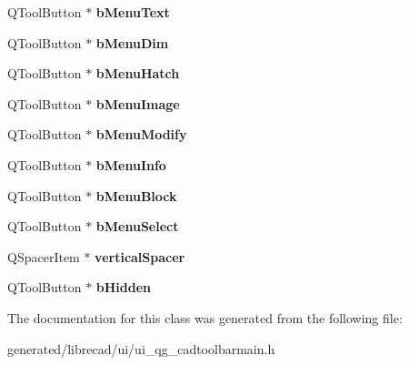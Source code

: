 \begin{DoxyCompactItemize}
\item 
\hypertarget{classUi__QG__CadToolBarMain_a41911ba633c4bcde1af62b72ae18f5fd}{Q\-Tool\-Button $\ast$ {\bfseries b\-Menu\-Text}}\label{classUi__QG__CadToolBarMain_a41911ba633c4bcde1af62b72ae18f5fd}

\item 
\hypertarget{classUi__QG__CadToolBarMain_a67d3a61254ef9d15b41d9de4131ca392}{Q\-Tool\-Button $\ast$ {\bfseries b\-Menu\-Dim}}\label{classUi__QG__CadToolBarMain_a67d3a61254ef9d15b41d9de4131ca392}

\item 
\hypertarget{classUi__QG__CadToolBarMain_a2be7b9b364c311cc0d6365adc1029621}{Q\-Tool\-Button $\ast$ {\bfseries b\-Menu\-Hatch}}\label{classUi__QG__CadToolBarMain_a2be7b9b364c311cc0d6365adc1029621}

\item 
\hypertarget{classUi__QG__CadToolBarMain_a27a05fd07c46bfca1a060d2c21ee260e}{Q\-Tool\-Button $\ast$ {\bfseries b\-Menu\-Image}}\label{classUi__QG__CadToolBarMain_a27a05fd07c46bfca1a060d2c21ee260e}

\item 
\hypertarget{classUi__QG__CadToolBarMain_a45615d4cdc8a5c83e16677ff0e3ff87b}{Q\-Tool\-Button $\ast$ {\bfseries b\-Menu\-Modify}}\label{classUi__QG__CadToolBarMain_a45615d4cdc8a5c83e16677ff0e3ff87b}

\item 
\hypertarget{classUi__QG__CadToolBarMain_a29c589d312c02b06b7988d540d0057fc}{Q\-Tool\-Button $\ast$ {\bfseries b\-Menu\-Info}}\label{classUi__QG__CadToolBarMain_a29c589d312c02b06b7988d540d0057fc}

\item 
\hypertarget{classUi__QG__CadToolBarMain_a724051edbf5e449ad440a1f82f79d5f1}{Q\-Tool\-Button $\ast$ {\bfseries b\-Menu\-Block}}\label{classUi__QG__CadToolBarMain_a724051edbf5e449ad440a1f82f79d5f1}

\item 
\hypertarget{classUi__QG__CadToolBarMain_a5fa0afeb0121b2b437f2696623e96129}{Q\-Tool\-Button $\ast$ {\bfseries b\-Menu\-Select}}\label{classUi__QG__CadToolBarMain_a5fa0afeb0121b2b437f2696623e96129}

\item 
\hypertarget{classUi__QG__CadToolBarMain_aca26dfad57c80e688b8f08bd67e800c7}{Q\-Spacer\-Item $\ast$ {\bfseries vertical\-Spacer}}\label{classUi__QG__CadToolBarMain_aca26dfad57c80e688b8f08bd67e800c7}

\item 
\hypertarget{classUi__QG__CadToolBarMain_a3224ea6c02cc9fa4abf07edd217ccf74}{Q\-Tool\-Button $\ast$ {\bfseries b\-Hidden}}\label{classUi__QG__CadToolBarMain_a3224ea6c02cc9fa4abf07edd217ccf74}

\end{DoxyCompactItemize}


The documentation for this class was generated from the following file\-:\begin{DoxyCompactItemize}
\item 
generated/librecad/ui/ui\-\_\-qg\-\_\-cadtoolbarmain.\-h\end{DoxyCompactItemize}
